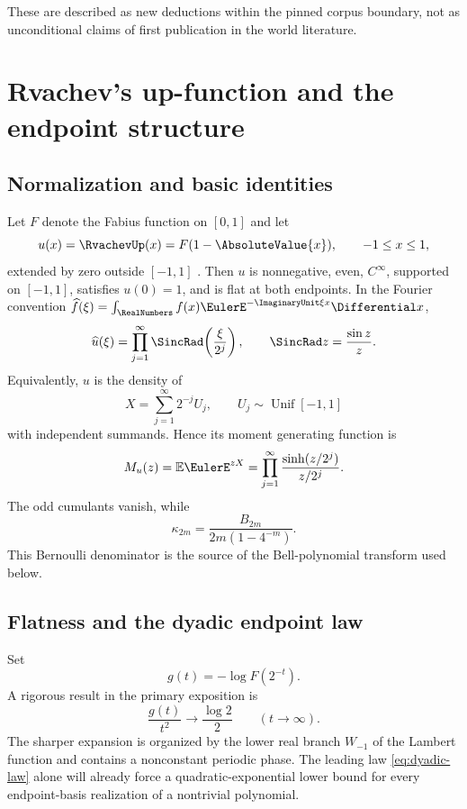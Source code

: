 \documentclass[11pt,oneside]{article}
\theoremstyle{definition}
\theoremstyle{remark}
\newcommand{\1}{\mathbf{1}}
\begin{document}
These are described as new deductions within the pinned corpus boundary, not
as unconditional claims of first publication in the world literature.

\section{Rvachev's up-function and the endpoint structure}
\label{sec:up-background}

\subsection{Normalization and basic identities}

Let $F$ denote the Fabius function on $[0,1]$ and let
\[
 u(x)=\RvachevUp(x)=F(1-\AbsoluteValue{x}),\qquad -1\le x\le1,
\]
extended by zero outside $[-1,1]$ \cite{Fabius1966,Rvachev1990,PrimaryRepo}.  Then $u$ is nonnegative, even,
$C^\infty$, supported on $[-1,1]$, satisfies $u(0)=1$, and is flat at both
endpoints.  In the Fourier convention
$\widehat f(\xi)=\int_{\RealNumbers}f(x)\EulerE^{-\ImaginaryUnit\xi x}\Differential x$,
\[
 \widehat u(\xi)=\prod_{j=1}^{\infty}\SincRad\!\left(\frac{\xi}{2^j}\right),
 \qquad \SincRad z=\frac{\sin z}{z}.
\]
Equivalently, $u$ is the density of
\[
 X=\sum_{j=1}^{\infty}2^{-j}U_j,
 \qquad U_j\sim\operatorname{Unif}[-1,1]
\]
with independent summands.  Hence its moment generating function is
\[
 M_u(z)=\mathbb E\EulerE^{zX}
 =\prod_{j=1}^{\infty}\frac{\sinh(z/2^j)}{z/2^j}.
\]
The odd cumulants vanish, while \cite{PrimaryRepo,UpSynthesisRepo}
\begin{equation}
 \kappa_{2m}=\frac{B_{2m}}{2m(1-4^{-m})}.
 \label{eq:cumulants}
\end{equation}
This Bernoulli denominator is the source of the Bell-polynomial transform
used below.

\subsection{Flatness and the dyadic endpoint law}

Set
\[
 g(t)=-\log F(2^{-t}).
\]
A rigorous result in the primary exposition is \cite{PrimaryRepo}
\begin{equation}
 \frac{g(t)}{t^2}\longrightarrow\frac{\log2}{2}
 \qquad(t\to\infty).
 \label{eq:dyadic-law}
\end{equation}
The sharper expansion is organized by the lower real branch $W_{-1}$ of the
Lambert function and contains a nonconstant periodic phase.  The leading law
\eqref{eq:dyadic-law} alone will already force a quadratic-exponential lower
bound for every endpoint-basis realization of a nontrivial polynomial.
\end{document}
